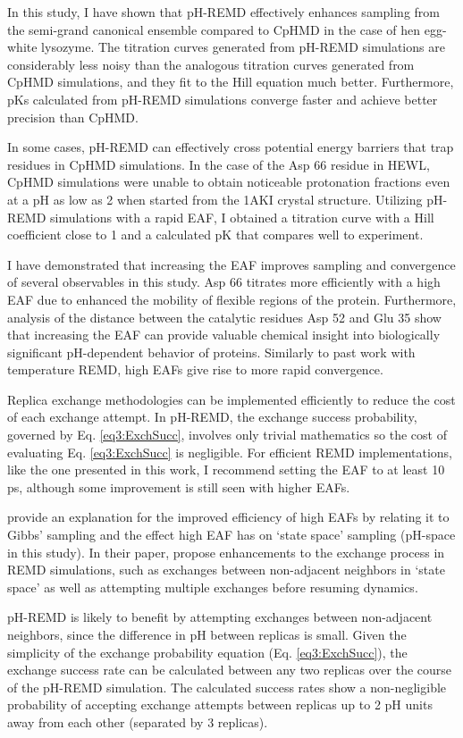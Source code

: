 In this study, I have shown that pH-REMD effectively enhances sampling from the
semi-grand canonical ensemble compared to CpHMD in the case of hen egg-white
lysozyme.  The titration curves generated from pH-REMD simulations are
considerably less noisy than the analogous titration curves generated from CpHMD
simulations, and they fit to the Hill equation much better.  Furthermore,
pKs calculated from pH-REMD simulations converge faster and achieve
better precision than CpHMD.

In some cases, pH-REMD can effectively cross potential energy barriers that trap
residues in CpHMD simulations.  In the case of the Asp 66 residue in HEWL, CpHMD
simulations were unable to obtain noticeable protonation fractions even at a pH
as low as 2 when started from the 1AKI crystal structure.  Utilizing pH-REMD
simulations with a rapid EAF, I obtained a titration curve with a Hill
coefficient close to 1 and a calculated pK that compares well to
experiment.

I have demonstrated that increasing the EAF improves sampling and convergence
of several observables in this study.  Asp 66 titrates more efficiently with a
high EAF due to enhanced the mobility of flexible regions of the protein.
Furthermore, analysis of the distance between the catalytic residues Asp 52 and
Glu 35 show that increasing the EAF can provide valuable chemical insight into
biologically significant pH-dependent behavior of proteins.  Similarly to past
work with temperature REMD, \cite{Sindhikara2008,Sindhikara2010} high EAFs give
rise to more rapid convergence.

Replica exchange methodologies can be implemented efficiently to reduce the cost
of each exchange attempt.  In pH-REMD, the exchange success probability,
governed by Eq. \ref{eq3:ExchSucc}, involves only trivial mathematics so the
cost of evaluating Eq. \ref{eq3:ExchSucc} is negligible.  For efficient REMD
implementations, like the one presented in this work, I recommend setting the
EAF to at least 10 ps, although some improvement is still seen with
higher EAFs.

\citeauthor{Chodera_JChemPhys_2011_v135_p194110}
\cite{Chodera_JChemPhys_2011_v135_p194110} provide an explanation for the
improved efficiency of high EAFs by relating it to Gibbs' sampling and the
effect high EAF has on `state space' sampling (pH-space in this study).  In
their paper, \citeauthor{Chodera_JChemPhys_2011_v135_p194110} propose
enhancements to the exchange process in REMD simulations, such as exchanges
between non-adjacent neighbors in `state space' as well as attempting multiple
exchanges before resuming dynamics. \cite{Chodera_JChemPhys_2011_v135_p194110}

pH-REMD is likely to benefit by attempting exchanges between non-adjacent
neighbors, since the difference in pH between replicas is small.  Given the
simplicity of the exchange probability equation (Eq. \ref{eq3:ExchSucc}), the
exchange success rate can be calculated between any two replicas over the course
of the pH-REMD simulation.  The calculated success rates show a non-negligible
probability of accepting exchange attempts between replicas up to 2 pH units
away from each other (\ie separated by 3 replicas).
